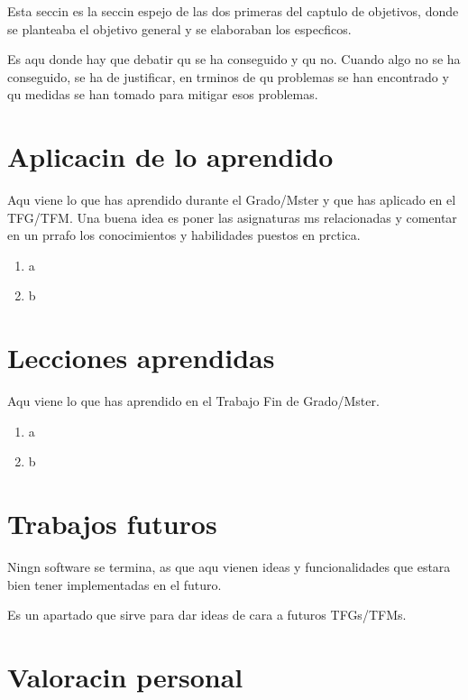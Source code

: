 \documentclass[a4paper, 12pt]{book}
\begin{document}
Esta seccin es la seccin espejo de las dos primeras del captulo de objetivos,
donde se planteaba el objetivo general y se elaboraban los especficos.

Es aqu donde hay que debatir qu se ha conseguido y qu no. Cuando algo no
se ha conseguido, se ha de justificar, en trminos de qu problemas se han
encontrado y qu medidas se han tomado para mitigar esos problemas.


\section{Aplicacin de lo aprendido}
\label{sec:aplicacion}

Aqu viene lo que has aprendido durante el Grado/Mster y que has aplicado
en el TFG/TFM. Una buena idea es poner las asignaturas ms relacionadas y
comentar en un prrafo los conocimientos y habilidades puestos en prctica.

\begin{enumerate}
  \item a
  \item b
\end{enumerate}


\section{Lecciones aprendidas}
\label{sec:lecciones_aprendidas}

Aqu viene lo que has aprendido en el Trabajo Fin de Grado/Mster.

\begin{enumerate}
  \item a
  \item b
\end{enumerate}


\section{Trabajos futuros}
\label{sec:trabajos_futuros}

Ningn software se termina, as que aqu vienen ideas y funcionalidades
que estara bien tener implementadas en el futuro.

Es un apartado que sirve para dar ideas de cara a futuros TFGs/TFMs.


\section{Valoracin personal}
\label{sec:valoracion}
\end{document}

